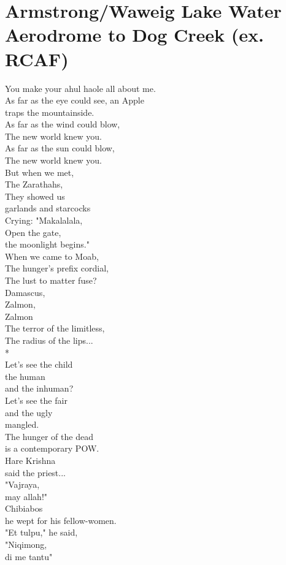 \documentclass[smalldemyvopaper,11pt,twoside,onecolumn,openright,extrafontsizes]{memoir}
\begin{document}
\chapter{Armstrong/Waweig Lake Water Aerodrome to Dog Creek (ex. RCAF)}
You make your ahul haole all about me.
\\As far as the eye could see, an Apple
\\traps the mountainside.
\\As far as the wind could blow,
\\The new world knew you.
\\As far as the sun could blow,
\\The new world knew you.
\\But when we met,
\\The Zarathahs,
\\They showed us
\\garlands and starcocks
\\Crying: "Makalalala,
\\Open the gate,
\\the moonlight begins."
\\When we came to Moab,
\\The hunger's prefix cordial,
\\The lust to matter fuse?
\\Damascus,
\\Zalmon,
\\Zalmon
\\The terror of the limitless,
\\The radius of the lips...
\\*
\\Let's see the child
\\the human
\\and the inhuman?
\\Let's see the fair
\\and the ugly
\\mangled.
\\The hunger of the dead
\\is a contemporary POW.
\\Hare Krishna
\\said the priest...
\\"Vajraya,
\\may allah!"
\\Chibiabos
\\he wept for his fellow-women.
\\"Et tulpu," he said,
\\"Niqimong,
\\di me tantu"
\end{document}
